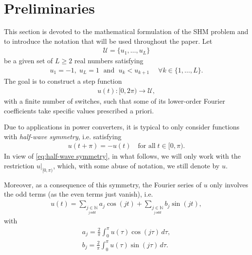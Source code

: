 \documentclass[twocolumn]{autart}    %
\begin{document}
\section{Preliminaries}\label{sec:math_formulation}

This section is devoted to the mathematical formulation of the SHM problem and to introduce the notation that will be used throughout the paper. Let 
\begin{align}\label{eq:Udef}
	\mathcal{U} = \{u_1, \ldots, u_L\}
\end{align}
be a given set of $L\geq 2$ real numbers satisfying
\begin{align*}
	u_1 = -1, \; u_L = 1 \;\text{ and } \; u_k<u_{k+1} \quad\; \forall k\in \{1,\ldots, L\}.
\end{align*}
The goal is to construct a step function
\begin{align*}
	u(t):[0,2\pi)\to\mathcal U,
\end{align*}
with a finite number of switches, such that some of its lower-order Fourier coefficients take specific values prescribed a priori.

Due to applications in power converters,  it is typical to only consider functions with \textit{half-wave symmetry}, i.e. satisfying
\begin{align}\label{eq:half-wave symmetry}
	u(t + \pi) = -u(t)\quad \mbox{for all}\; t \in [0,\pi).
\end{align}
In view of \eqref{eq:half-wave symmetry}, in what follows, we will only work with the restriction $u|_{[0,\pi)}$, which, with some abuse of notation, we still denote by $u$. 

Moreover, as a consequence of this symmetry, the Fourier series of $u$ only involves the odd terms (as the even terms just vanish), i.e.
\begin{align*}
	u(t) = \sum_{\underset{j\, odd}{j \in \mathbb{N}}} a_j \cos(jt)+ \sum_{\underset{j\, odd}{j \in \mathbb{N}}}  b_j \sin(jt),
\end{align*}
with
\begin{equation} \label{eq:an}
	\begin{aligned}
		a_j = \frac{2}{\pi} \int_0^\pi u(\tau ) \cos(j \tau)\,d\tau, 
		\\[5pt]
		b_j = \frac{2}{\pi} \int_0^\pi u(\tau)  \sin(j \tau)\,d\tau.
	\end{aligned}
\end{equation}
\end{document}
